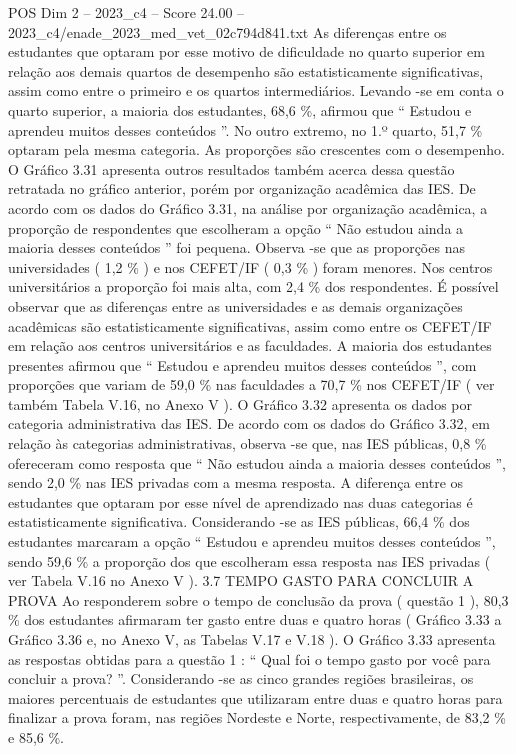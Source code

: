 \begin{textsample}{POS Dim 2 – 2023\_c4 – Score 24.00 – 2023\_c4/enade\_2023\_med\_vet\_02c794d841.txt}
As diferenças entre os estudantes que optaram por esse motivo de dificuldade no quarto superior em relação aos demais quartos de desempenho são estatisticamente significativas, assim como entre o primeiro e os quartos intermediários.
Levando -se em conta o quarto superior, a maioria dos estudantes, 68,6 \%, afirmou que “ Estudou e aprendeu muitos desses conteúdos ”.
No outro extremo, no 1.º quarto, 51,7 \% optaram pela mesma categoria.
As proporções são crescentes com o desempenho.
O Gráfico 3.31 apresenta outros resultados também acerca dessa questão retratada no gráfico anterior, porém por organização acadêmica das IES.
De acordo com os dados do Gráfico 3.31, na análise por organização acadêmica, a proporção de respondentes que escolheram a opção “ Não estudou ainda a maioria desses conteúdos ” foi pequena.
Observa -se que as proporções nas universidades ( 1,2 \% ) e nos CEFET/IF ( 0,3 \% ) foram menores.
Nos centros universitários a proporção foi mais alta, com 2,4 \% dos respondentes.
É possível observar que as diferenças entre as universidades e as demais organizações acadêmicas são estatisticamente significativas, assim como entre os CEFET/IF em relação aos centros universitários e as faculdades.
A maioria dos estudantes presentes afirmou que “ Estudou e aprendeu muitos desses conteúdos ”, com proporções que variam de 59,0 \% nas faculdades a 70,7 \% nos CEFET/IF ( ver também Tabela V.16, no Anexo V ).
O Gráfico 3.32 apresenta os dados por categoria administrativa das IES.
De acordo com os dados do Gráfico 3.32, em relação às categorias administrativas, observa -se que, nas IES públicas, 0,8 \% ofereceram como resposta que “ Não estudou ainda a maioria desses conteúdos ”, sendo 2,0 \% nas IES privadas com a mesma resposta.
A diferença entre os estudantes que optaram por esse nível de aprendizado nas duas categorias é estatisticamente significativa.
Considerando -se as IES públicas, 66,4 \% dos estudantes marcaram a opção “ Estudou e aprendeu muitos desses conteúdos ”, sendo 59,6 \% a proporção dos que escolheram essa resposta nas IES privadas ( ver Tabela V.16 no Anexo V ). 3.7 TEMPO GASTO PARA CONCLUIR A PROVA Ao responderem sobre o tempo de conclusão da prova ( questão 1 ), 80,3 \% dos estudantes afirmaram ter gasto entre duas e quatro horas ( Gráfico 3.33 a Gráfico 3.36 e, no Anexo V, as Tabelas V.17 e V.18 ).
O Gráfico 3.33 apresenta as respostas obtidas para a questão 1 : “ Qual foi o tempo gasto por você para concluir a prova? ”.
Considerando -se as cinco grandes regiões brasileiras, os maiores percentuais de estudantes que utilizaram entre duas e quatro horas para finalizar a prova foram, nas regiões Nordeste e Norte, respectivamente, de 83,2 \% e 85,6 \%.

\end{textsample}
